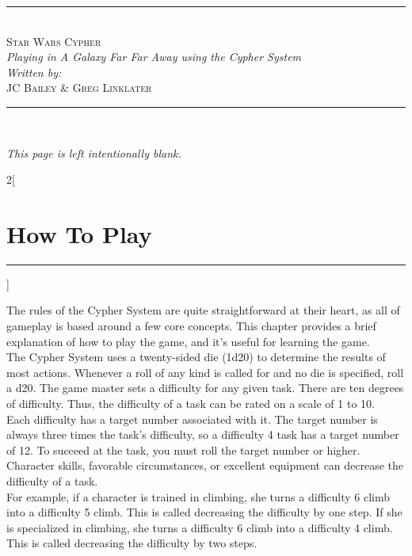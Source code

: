 \documentclass[a4paper,10pt,final]{book}
\newcommand{\DocTitle}{Star Wars Cypher}
\newcommand{\DocSubtitle}{Playing in A Galaxy Far Far Away using the Cypher System}
\newcommand{\DocAuthors}{JC Bailey \& Greg Linklater}
\newcommand{\HRule}{\rule{\linewidth}{0.5mm}} %
\newcommand{\newSection}[1]{\section*{#1} \addcontentsline{toc}{section}{#1} \label{sec:#1} \HRule}
\newenvironment{docsection}[1]
{
  \begin{multicols*}{2}[\newSection{#1}]
}
{
  \end{multicols*}
  \newpage
}
\newenvironment{docBlankPage}
{
	\begin{center}
	\vspace*{\fill}
}
{
	\vspace*{\fill}
	\end{center}
}
\begin{document}
\frontmatter

\begin{titlepage}
\center
\vspace*{\fill}
\HRule \\[4mm]

{ \huge \textsc{\DocTitle} }\\ %
{ \small \textit{\DocSubtitle} }\\[3mm]

\emph{Written by:}\\
{\small \textsc{\DocAuthors}} \\%

\HRule \\[3mm]
\vspace*{\fill}
\end{titlepage}


\pagestyle{plain}
\begin{docBlankPage}
\textit{This page is left intentionally blank.}
\end{docBlankPage}
\tableofcontents
\mainmatter %


\begin{docsection}{How To Play}

The rules of the Cypher System are quite straightforward at their heart, as 
all of gameplay is based around a few core concepts. This chapter provides a
 brief explanation of how to play the game, and it’s useful for learning the 
 game. \\

The Cypher System uses a twenty-sided die (1d20) to determine the results of most actions. 
Whenever a roll of any kind is called for and no die is specified, roll a d20.
The game master sets a difficulty for any given task. There are ten degrees of difficulty. 
Thus, the difficulty of a task can be rated on a scale of 1 to 10. \\

Each difficulty has a target number
associated with it. The target number is
always three times the task’s difficulty, so
a difficulty 4 task has a target number of
12. To succeed at the task, you must roll
the target number or higher. \\

Character skills, favorable circumstances,
or excellent equipment can decrease
the difficulty of a task. \\

For example, if a character is trained in climbing, she turns
a difficulty 6 climb into a difficulty 5 climb.
This is called decreasing the difficulty by
one step. If she is specialized in climbing,
she turns a difficulty 6 climb into a difficulty
4 climb. This is called decreasing the
difficulty by two steps. \\


\end{docsection}
\end{document}
